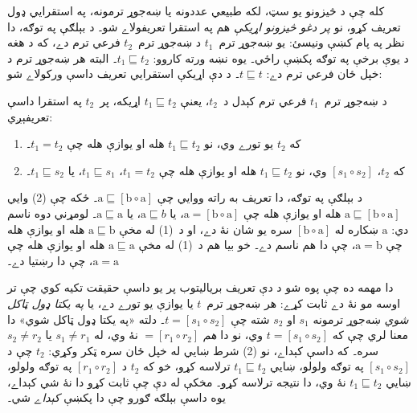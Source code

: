 \documentclass[../../../include/open-logic-section]{subfiles}
\begin{document}


کله چې د څيزونو يو سټ، لکه طبيعي عددونه يا ښه‌جوړ
ترمونه، په استقرايي ډول تعريف کړو، نو \emph{پر دغو
څيزونو اړيکې} هم په استقرا تعريفولاے شو۔ د بېلګې
په توګه، دا نظر په پام کښې ونيسئ: يو ښه‌جوړ
ترم~$t_1$ د ښه‌جوړ ترم~$t_2$ فرعي ترم دے، که د
هغه د يوې برخې په توګه پکښې راځي۔ يوه نښه ورته
کاروو: $t_1 \sqsubseteq t_2$۔ البته هر ښه‌جوړ
ترم د خپل ځان فرعي ترم دے: $t \sqsubseteq t$۔
د دې اړيکې استقرايي تعريف داسې ورکولاے شو:

\begin{defn}
د ښه‌جوړ ترم~$t_1$ فرعي ترم کېدل د~$t_2$، يعنې
$t_1
  \sqsubseteq t_2$ اړيکه، پر~$t_2$ په استقرا
داسې تعريفېږي:
  \begin{enumerate}
  \item که $t_2$ يو تورے وي، نو $t_1 \sqsubseteq t_2$
    هله او يوازې هله چې $t_1 = t_2$۔
  \item که $t_2$، $[s_1 \circ s_2]$ وي، نو
    $t_1 \sqsubseteq t_2$ هله او يوازې هله چې
    $t_1 =
    t_2$، $t_1 \sqsubseteq s_1$، يا $t_1 \sqsubseteq s_2$۔
  \end{enumerate}
\end{defn}

د بېلګې په توګه، دا تعريف به راته ووايي چې
$\mathrm{a}
\sqsubseteq [\mathrm{b} \circ \mathrm{a}]$۔ ځکه چې
(2) وايي $\mathrm{a} \sqsubseteq [\mathrm{b} \circ \mathrm{a}]$
هله او يوازې هله چې $\mathrm{a}
= [\mathrm{b} \circ \mathrm{a}]$، يا $\mathrm{a} \sqsubseteq b$،
يا $\mathrm{a} \sqsubseteq \mathrm{a}$۔ لومړني دوه
ناسم دي: $\mathrm{a}$ ښکاره له $[\mathrm{b} \circ
  \mathrm{a}]$ سره يو شان نۀ دے، او د~(1) له مخې
$\mathrm{a} \sqsubseteq \mathrm{b}$ هله او يوازې
هله چې $\mathrm{a} = \mathrm{b}$، چې دا هم ناسم
دے۔ خو بيا هم د~(1) له مخې $\mathrm{a} \sqsubseteq \mathrm{a}$
هله او يوازې هله چې $\mathrm{a} = \mathrm{a}$،
چې دا رښتيا دے۔

دا مهمه ده چې پوه شو د دې تعريف برياليتوب پر
يو داسې حقيقت تکيه کوي چې تر اوسه مو نۀ دے
ثابت کړے: هر ښه‌جوړ ترم~$t$ يا يوازې يو تورے
دے، يا \emph{په يکتا ډول ټاکل شوي} ښه‌جوړ
ترمونه $s_1$ او $s_2$ شته چې $t = [s_1 \circ s_2]$۔
دلته «په يکتا ډول ټاکل شوي» دا معنا لري چې
که $t = [s_1 \circ s_2]$ وي، نو دا \emph{هم}
$= [r_1 \circ r_2]$ نۀ وي، له $s_1 \neq r_1$
يا $s_2 \neq r_2$ سره۔ که داسې کېداے، نو (2)
شرط ښايي له خپل ځان سره ټکر وکړي: $t_2$ چې
د $[s_1 \circ s_2]$ په توګه ولولو، ښايي
$t_1
\sqsubseteq t_2$ ترلاسه کړو، خو که $t_2$ د
$[r_1 \circ r_2]$ په توګه ولولو، ښايي
$t_1 \sqsubseteq t_2$ نۀ وي، دا نتيجه ترلاسه کړو۔ مخکې
له دې چې ثابت کړو دا نۀ شي کېداے، يوه داسې
بېلګه ګورو چې دا پکښې \emph{کېداے} شي۔
\end{document}
